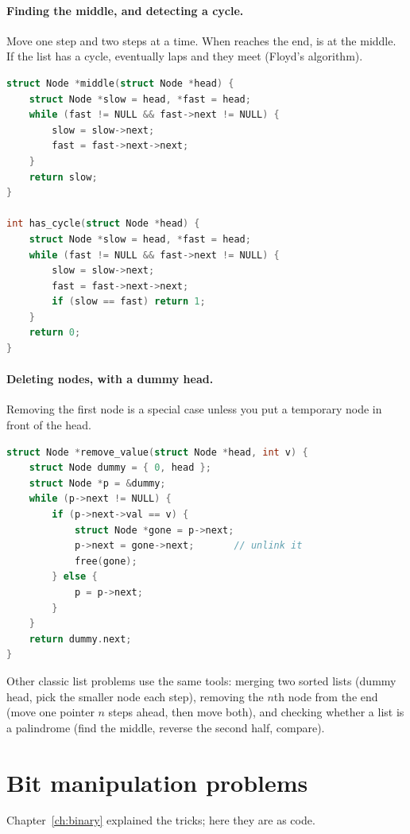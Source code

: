 \paragraph{Finding the middle, and detecting a cycle.} Move  one step and  two steps at a time. When  reaches the end,  is at the middle. If the list has a cycle,  eventually laps  and they meet (Floyd's algorithm).
\begin{lstlisting}[language=C]
struct Node *middle(struct Node *head) {
    struct Node *slow = head, *fast = head;
    while (fast != NULL && fast->next != NULL) {
        slow = slow->next;
        fast = fast->next->next;
    }
    return slow;
}

int has_cycle(struct Node *head) {
    struct Node *slow = head, *fast = head;
    while (fast != NULL && fast->next != NULL) {
        slow = slow->next;
        fast = fast->next->next;
        if (slow == fast) return 1;
    }
    return 0;
}
\end{lstlisting}

\paragraph{Deleting nodes, with a dummy head.} Removing the first node is a special case unless you put a temporary  node in front of the head.
\begin{lstlisting}[language=C]
struct Node *remove_value(struct Node *head, int v) {
    struct Node dummy = { 0, head };
    struct Node *p = &dummy;
    while (p->next != NULL) {
        if (p->next->val == v) {
            struct Node *gone = p->next;
            p->next = gone->next;       // unlink it
            free(gone);
        } else {
            p = p->next;
        }
    }
    return dummy.next;
}
\end{lstlisting}

Other classic list problems use the same tools: merging two sorted lists (dummy head, pick the smaller node each step), removing the $n$th node from the end (move one pointer $n$ steps ahead, then move both), and checking whether a list is a palindrome (find the middle, reverse the second half, compare).

\section{Bit manipulation problems}

Chapter~\ref{ch:binary} explained the tricks; here they are as code.

